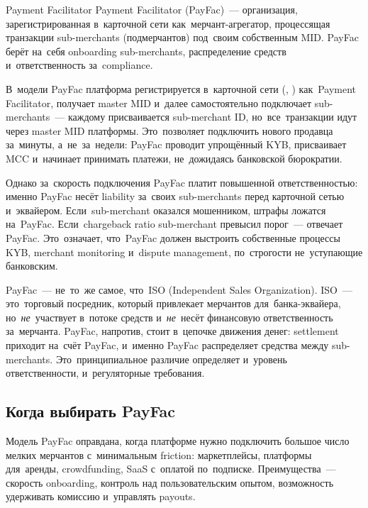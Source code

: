 \begin{termdef}{Payment Facilitator}
  Payment Facilitator (PayFac)~--- организация, зарегистрированная
  в~карточной сети как~мерчант-агрегатор, процессящая транзакции
  sub-merchants (подмерчантов) под~своим собственным MID.
  PayFac берёт на~себя onboarding sub-merchants, распределение
  средств и~ответственность за~compliance.
\end{termdef}

В~модели PayFac платформа регистрируется в~карточной сети
(, ) как~Payment Facilitator,
получает master MID и~далее самостоятельно подключает
sub-merchants~--- каждому присваивается sub-merchant ID,
но~все~транзакции идут через master MID платформы. Это~позволяет
подключить нового продавца за~минуты, а~не~за~недели: PayFac
проводит упрощённый KYB, присваивает MCC и~начинает принимать
платежи, не~дожидаясь банковской бюрократии.

Однако за~скорость подключения PayFac платит повышенной
ответственностью: именно PayFac несёт liability
за~своих sub-merchants перед карточной сетью и~эквайером.
Если~sub-merchant оказался мошенником, штрафы ложатся
на~PayFac. Если~chargeback ratio sub-merchant превысил
порог~--- отвечает PayFac. Это~означает, что~PayFac
должен выстроить собственные процессы KYB, merchant
monitoring и~dispute management, по~строгости не~уступающие
банковским.

\begin{important}
  PayFac~--- не~то~же самое, что~ISO (Independent Sales
  Organization). ISO~--- это~торговый посредник, который
  привлекает мерчантов для~банка-эквайера, но~\emph{не}~участвует
  в~потоке средств и~\emph{не}~несёт финансовую ответственность
  за~мерчанта. PayFac, напротив, стоит в~цепочке движения денег:
  settlement приходит на~счёт PayFac, и~именно PayFac распределяет
  средства между sub-merchants. Это~принципиальное различие
  определяет и~уровень ответственности, и~регуляторные
  требования.
\end{important}

\subsection*{Когда выбирать PayFac}

Модель PayFac оправдана, когда платформе нужно подключить
большое число мелких мерчантов с~минимальным friction: маркетплейсы,
платформы для~аренды, crowdfunding, SaaS с~оплатой по~подписке.
Преимущества~--- скорость onboarding, контроль над пользовательским
опытом, возможность удерживать комиссию и~управлять payouts.

